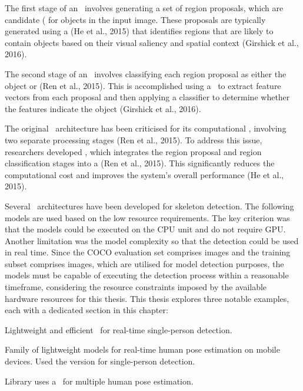 \startitemize[1]
 \item {} The first stage of an \RCNN\ involves generating a set of region proposals, which are candidate  (\BBOX\) for objects in the input image. These proposals are typically generated using a  (\scc He et al., 2015) that identifies regions that are likely to contain objects based on their visual saliency and spatial context (\scc Girshick et al., 2016).
 \item {} The second stage of an \RCNN\ involves classifying each region proposal as either  the ob\-ject or  (\scc Ren et al., 2015). This is accomplished using a \CNN\ to extract feature vectors from each proposal and then applying a classifier to determine whether the features indicate the ob\-ject (\scc Girshick et al., 2016).
\stopitemize

The original \RCNN\ architecture has been criticised for its computational , involving two separate processing stages (\scc Ren et al., 2015). To address this issue, researchers developed , which integrates the region proposal and region classification stages into a  (\scc Ren et al., 2015). This significantly reduces the computational cost and improves the system's overall performance (\scc He et al., 2015).

Several \NN\ architectures have been developed for skeleton detection. The following models are used based on the low resource requirements. The key criterion was that the models could be executed on the CPU unit and do not require GPU. Another limitation was the model complexity so that the detection could be used in real time. Since the COCO evaluation set comprises  images and the training subset comprises  images, which are utilised for model detection purposes, the models must be capable of executing the detection process within a reasonable timeframe, considering the resource constraints imposed by the available hardware resources for this thesis. This thesis explores three notable examples, each with a dedicated section in this chapter:

\startitemize[n]
 \item {} Lightweight and efficient \CNN\ for real-time single-person detection.
 \item {} Family of lightweight models for real-time human pose es\-timation on mobile devices. Used the  version for single-person detection.
 \item {} Library uses a \CNN\ for multiple human pose estimation.
\stopitemize

